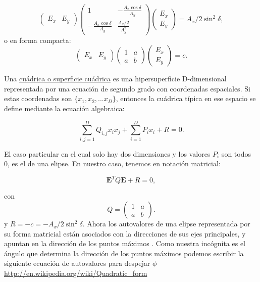 \begin{equation}
\begin{pmatrix}
E_x & E_y
\end{pmatrix}
\begin{pmatrix}
1 & -\frac{A_x\cos{\delta}}{A_y}\\
 -\frac{A_x\cos{\delta}}{A_y} & \frac{A_x/2}{A_y^2} 
\end{pmatrix}
\begin{pmatrix}
E_x \\ E_y
\end{pmatrix}
=A_x/2\sin^2{\delta},
\end{equation}
o en forma compacta:
\begin{equation}
\begin{pmatrix}
E_x & E_y
\end{pmatrix}
\begin{pmatrix}
1 & a\\
 a & b 
\end{pmatrix}
\begin{pmatrix}
E_x \\ E_y
\end{pmatrix}
=c.
\end{equation}

Una \href{http://es.wikipedia.org/wiki/Cu\%C3\%A1drica}{cuádrica o
  superficie cuádrica} es una  hipersuperficie D-dimensional
representada por una ecuación de segundo grado con 
coordenadas espaciales. Si estas coordenadas son $\{x_1,
x_2, ... x_D\}$, entonces la cuádrica típica en ese espacio se define
mediante la ecuación algebraica: 

\[ \sum_{i,j=1}^D Q_{i,j} x_i x_j + \sum_{i=1}^D P_i x_i + R = 0. \]

El caso particular en el cual solo hay dos dimensiones y los valores
$P_i$ son todos 0, es el de una elipse. En nuestro caso, tenemos en
notación matricial:

\[ \mathbf{E}^TQ\mathbf{E} + R= 0, \]
 
con
\[
Q=
\begin{pmatrix}
1 & a\\
 a & b 
\end{pmatrix}.
 \]
y $R=-c = -A_x/2\sin^2{\delta}$. Ahora los autovalores de una elipse
representada por su forma matricial están asociados con la
direcciones de sus ejes principales, y apuntan en la dirección de los
puntos máximos . Como nuestra incógnita es el ángulo
que determina la dirección de los puntos máximos podemos escribir la
siguiente ecuación de autovalores para despejar $\phi$
\url{http://en.wikipedia.org/wiki/Quadratic_form}


